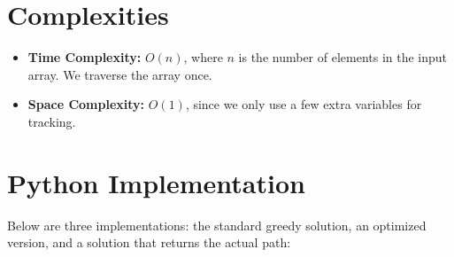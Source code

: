 
\section*{Complexities}

\begin{itemize}
    \item \textbf{Time Complexity:} \(O(n)\), where \(n\) is the number of elements in the input array. We traverse the array once.
    \item \textbf{Space Complexity:} \(O(1)\), since we only use a few extra variables for tracking.
\end{itemize}

\newpage
\section*{Python Implementation}


Below are three implementations: the standard greedy solution, an optimized version, and a solution that returns the actual path:

